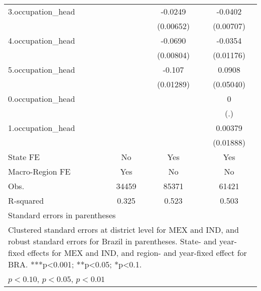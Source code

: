 \begin{table}[htbp]
{\begin{tabular}{l*{3}{c}}
3.occupation_head&                     &     -0.0249\sym{***}&     -0.0402\sym{***}\\
            &                     &   (0.00652)         &   (0.00707)         \\
4.occupation_head&                     &     -0.0690\sym{***}&     -0.0354\sym{***}\\
            &                     &   (0.00804)         &   (0.01176)         \\
5.occupation_head&                     &      -0.107\sym{***}&      0.0908\sym{*}  \\
            &                     &   (0.01289)         &   (0.05040)         \\
0.occupation_head&                     &                     &           0         \\
            &                     &                     &         (.)         \\
1.occupation_head&                     &                     &     0.00379         \\
            &                     &                     &   (0.01888)         \\
State FE    &          No         &         Yes         &         Yes         \\
Macro-Region FE &         Yes         &          No         &          No         \\
\hline
Obs.        &       34459         &       85371         &       61421         \\
R-squared   &       0.325         &       0.523         &       0.503         \\
\hline\hline
\multicolumn{4}{l}{\footnotesize Standard errors in parentheses}\\
\multicolumn{4}{l}{\footnotesize Clustered standard errors at district level for MEX and IND, and robust standard errors for Brazil in parentheses. State- and year-fixed effects for MEX and IND, and region- and year-fixed effect for BRA. ***p<0.001; **p<0.05; *p<0.1.}\\
\multicolumn{4}{l}{\footnotesize \sym{*} \(p<0.10\), \sym{**} \(p<0.05\), \sym{***} \(p<0.01\)}\\
\end{tabular}}
\end{table}
